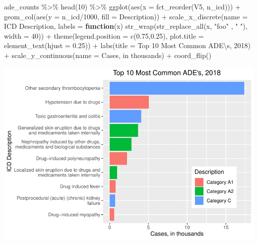 \documentclass[preprint, 3p,
authoryear]{elsarticle} %
\newenvironment{Shaded}{\begin{snugshade}}{\end{snugshade}}
\newcommand{\AttributeTok}[1]{\textcolor[rgb]{0.77,0.63,0.00}{#1}}
\newcommand{\ControlFlowTok}[1]{\textcolor[rgb]{0.13,0.29,0.53}{\textbf{#1}}}
\newcommand{\DecValTok}[1]{\textcolor[rgb]{0.00,0.00,0.81}{#1}}
\newcommand{\FloatTok}[1]{\textcolor[rgb]{0.00,0.00,0.81}{#1}}
\newcommand{\FunctionTok}[1]{\textcolor[rgb]{0.00,0.00,0.00}{#1}}
\newcommand{\NormalTok}[1]{#1}
\newcommand{\SpecialCharTok}[1]{\textcolor[rgb]{0.00,0.00,0.00}{#1}}
\newcommand{\StringTok}[1]{\textcolor[rgb]{0.31,0.60,0.02}{#1}}
\begin{document}
\begin{Shaded}
\begin{Highlighting}[]
\NormalTok{ade\_counts }\SpecialCharTok{\%\textgreater{}\%}
  \FunctionTok{head}\NormalTok{(}\DecValTok{10}\NormalTok{) }\SpecialCharTok{\%\textgreater{}\%}
  \FunctionTok{ggplot}\NormalTok{(}\FunctionTok{aes}\NormalTok{(}\AttributeTok{x =} \FunctionTok{fct\_reorder}\NormalTok{(V5, n\_icd))) }\SpecialCharTok{+}
  \FunctionTok{geom\_col}\NormalTok{(}\FunctionTok{aes}\NormalTok{(}\AttributeTok{y =}\NormalTok{ n\_icd}\SpecialCharTok{/}\DecValTok{1000}\NormalTok{, }\AttributeTok{fill =}\NormalTok{ Description)) }\SpecialCharTok{+} 
  \FunctionTok{scale\_x\_discrete}\NormalTok{(}\AttributeTok{name =} \StringTok{\textquotesingle{}ICD Description\textquotesingle{}}\NormalTok{, }\AttributeTok{labels =} \ControlFlowTok{function}\NormalTok{(x) }\FunctionTok{str\_wrap}\NormalTok{(}\FunctionTok{str\_replace\_all}\NormalTok{(x, }\StringTok{"foo"}\NormalTok{ , }\StringTok{" "}\NormalTok{),}
                                                 \AttributeTok{width =} \DecValTok{40}\NormalTok{)) }\SpecialCharTok{+}
  \FunctionTok{theme}\NormalTok{(}\AttributeTok{legend.position =} \FunctionTok{c}\NormalTok{(}\FloatTok{0.75}\NormalTok{,}\FloatTok{0.25}\NormalTok{), }\AttributeTok{plot.title =} \FunctionTok{element\_text}\NormalTok{(}\AttributeTok{hjust =} \FloatTok{0.25}\NormalTok{)) }\SpecialCharTok{+}
  \FunctionTok{labs}\NormalTok{(}\AttributeTok{title =} \StringTok{\textquotesingle{}Top 10 Most Common ADE}\SpecialCharTok{\textbackslash{}\textquotesingle{}}\StringTok{s, 2018\textquotesingle{}}\NormalTok{) }\SpecialCharTok{+}
  \FunctionTok{scale\_y\_continuous}\NormalTok{(}\AttributeTok{name =} \StringTok{\textquotesingle{}Cases, in thousands\textquotesingle{}}\NormalTok{) }\SpecialCharTok{+}
  \FunctionTok{coord\_flip}\NormalTok{() }
\end{Highlighting}
\end{Shaded}

\includegraphics{final-project-paper_files/figure-latex/top-10-ade-1.pdf}
\end{document}
